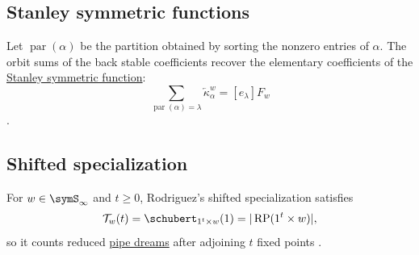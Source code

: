 \subsection[backStableStanleyOrbitSums]{Stanley symmetric functions}

Let $\operatorname{par}(\alpha)$ be the partition obtained by sorting the
nonzero entries of $\alpha$.  The orbit sums of the back stable coefficients
recover the elementary coefficients of the
\hyperref[stanleySym]{Stanley symmetric function}:
\[
  \sum_{\operatorname{par}(\alpha)=\lambda}
  \overleftarrow{\kappa}^w_\alpha
  =
  [e_\lambda]F_w
\]
\cite[Thm.~5.4]{Rodriguez2026x}.


\subsection[backStableShiftedSpecialization]{Shifted specialization}

For $w\in\symS_\infty$ and $t\geq0$, Rodriguez's shifted specialization
satisfies
\[
  \mathcal T_w(t)
  =
  \schubert_{1^t\times w}(1)
  =
  |\operatorname{RP}(1^t\times w)|,
\]
so it counts reduced \hyperref[pipeDream]{pipe dreams} after adjoining $t$
fixed points \cite[Def.~6.1 and Prop.~6.3]{Rodriguez2026x}.
